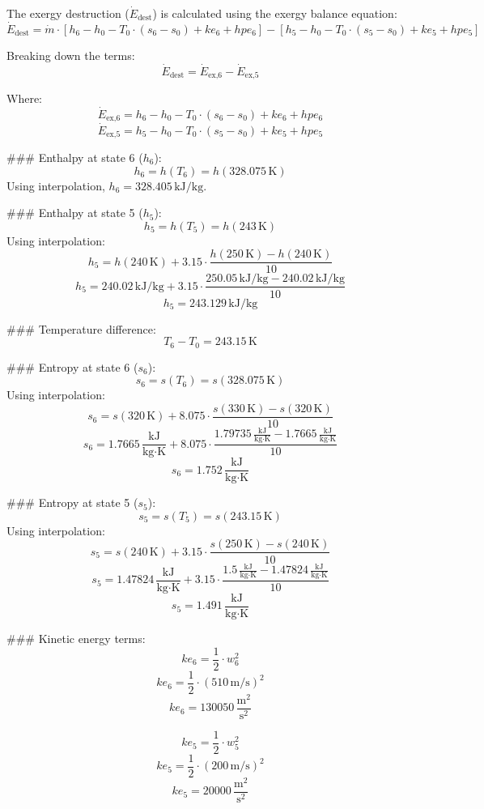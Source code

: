 The exergy destruction (\( \dot{E}_{\text{dest}} \)) is calculated using the exergy balance equation:  
\[
\dot{E}_{\text{dest}} = \dot{m} \cdot \left[ h_6 - h_0 - T_0 \cdot (s_6 - s_0) + ke_6 + hpe_6 \right] - \left[ h_5 - h_0 - T_0 \cdot (s_5 - s_0) + ke_5 + hpe_5 \right]
\]

Breaking down the terms:  
\[
\dot{E}_{\text{dest}} = \dot{E}_{\text{ex,6}} - \dot{E}_{\text{ex,5}}
\]

Where:  
\[
\dot{E}_{\text{ex,6}} = h_6 - h_0 - T_0 \cdot (s_6 - s_0) + ke_6 + hpe_6
\]
\[
\dot{E}_{\text{ex,5}} = h_5 - h_0 - T_0 \cdot (s_5 - s_0) + ke_5 + hpe_5
\]

### Enthalpy at state 6 (\( h_6 \)):  
\[
h_6 = h(T_6) = h(328.075 \, \text{K})
\]
Using interpolation, \( h_6 = 328.405 \, \text{kJ/kg} \).

### Enthalpy at state 5 (\( h_5 \)):  
\[
h_5 = h(T_5) = h(243 \, \text{K})
\]
Using interpolation:  
\[
h_5 = h(240 \, \text{K}) + 3.15 \cdot \frac{h(250 \, \text{K}) - h(240 \, \text{K})}{10}
\]
\[
h_5 = 240.02 \, \text{kJ/kg} + 3.15 \cdot \frac{250.05 \, \text{kJ/kg} - 240.02 \, \text{kJ/kg}}{10}
\]
\[
h_5 = 243.129 \, \text{kJ/kg}
\]

### Temperature difference:  
\[
T_6 - T_0 = 243.15 \, \text{K}
\]

### Entropy at state 6 (\( s_6 \)):  
\[
s_6 = s(T_6) = s(328.075 \, \text{K})
\]
Using interpolation:  
\[
s_6 = s(320 \, \text{K}) + 8.075 \cdot \frac{s(330 \, \text{K}) - s(320 \, \text{K})}{10}
\]
\[
s_6 = 1.7665 \, \frac{\text{kJ}}{\text{kg·K}} + 8.075 \cdot \frac{1.79735 \, \frac{\text{kJ}}{\text{kg·K}} - 1.7665 \, \frac{\text{kJ}}{\text{kg·K}}}{10}
\]
\[
s_6 = 1.752 \, \frac{\text{kJ}}{\text{kg·K}}
\]

### Entropy at state 5 (\( s_5 \)):  
\[
s_5 = s(T_5) = s(243.15 \, \text{K})
\]
Using interpolation:  
\[
s_5 = s(240 \, \text{K}) + 3.15 \cdot \frac{s(250 \, \text{K}) - s(240 \, \text{K})}{10}
\]
\[
s_5 = 1.47824 \, \frac{\text{kJ}}{\text{kg·K}} + 3.15 \cdot \frac{1.5 \, \frac{\text{kJ}}{\text{kg·K}} - 1.47824 \, \frac{\text{kJ}}{\text{kg·K}}}{10}
\]
\[
s_5 = 1.491 \, \frac{\text{kJ}}{\text{kg·K}}
\]

### Kinetic energy terms:  
\[
ke_6 = \frac{1}{2} \cdot w_6^2
\]
\[
ke_6 = \frac{1}{2} \cdot (510 \, \text{m/s})^2
\]
\[
ke_6 = 130050 \, \frac{\text{m}^2}{\text{s}^2}
\]

\[
ke_5 = \frac{1}{2} \cdot w_5^2
\]
\[
ke_5 = \frac{1}{2} \cdot (200 \, \text{m/s})^2
\]
\[
ke_5 = 20000 \, \frac{\text{m}^2}{\text{s}^2}
\]